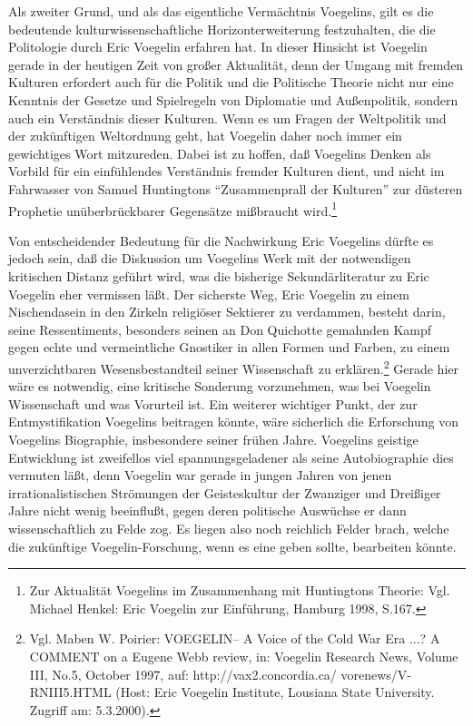 Als zweiter Grund, und als das eigentliche Vermächtnis Voegelins, gilt
es die bedeutende kulturwissenschaftliche Horizonterweiterung
festzuhalten, die die Politologie durch Eric Voegelin erfahren hat. In
dieser Hinsicht ist Voegelin gerade in der heutigen Zeit von großer
Aktualität, denn der Umgang mit fremden Kulturen erfordert auch für die
Politik und die Politische Theorie nicht nur eine Kenntnis der Gesetze
und Spielregeln von Diplomatie und Außenpolitik, sondern auch ein
Verständnis dieser Kulturen.  Wenn es um Fragen der Weltpolitik und der
zukünftigen Weltordnung geht, hat Voegelin daher noch immer ein
gewichtiges Wort mitzureden. Dabei ist zu hoffen, daß Voegelins Denken
als Vorbild für ein einfühlendes Verständnis fremder Kulturen dient, und
nicht im Fahrwasser von Samuel Huntingtons "`Zusammenprall der
Kulturen"' zur düsteren Prophetie unüberbrückbarer Gegensätze mißbraucht
wird.\footnote{Zur Aktualität Voegelins im Zusammenhang mit Huntingtons
  Theorie: Vgl.  Michael Henkel: Eric Voegelin zur Einführung, Hamburg
  1998, S.167.}

Von entscheidender Bedeutung für die Nachwirkung Eric Voegelins dürfte es
jedoch sein, daß die Diskussion um Voegelins Werk mit der notwendigen
kritischen Distanz geführt wird, was die bisherige Sekundärliteratur zu Eric
Voegelin eher vermissen läßt. Der sicherste Weg, Eric Voegelin zu einem
Nischendasein in den Zirkeln religiöser Sektierer zu verdammen, besteht
darin, seine Ressentiments, besonders seinen an Don Quichotte gemahnden Kampf
gegen echte und vermeintliche Gnostiker in allen Formen und Farben, zu einem
unverzichtbaren Wesensbestandteil seiner Wissenschaft zu
erklären.\footnote{Vgl.  Maben W. Poirier: VOEGELIN-- A Voice of the Cold War
  Era ...? A COMMENT on a Eugene Webb review, in: Voegelin Research News,
  Volume III, No.5, October 1997, auf: http://vax2.concordia.ca/\~{
    }vorenews/V-RNIII5.HTML (Host: Eric Voegelin Institute, Lousiana State
  University. Zugriff am: 5.3.2000).}  Gerade hier wäre es notwendig, eine
kritische Sonderung vorzunehmen, was bei Voegelin Wissenschaft und was
Vorurteil ist. Ein weiterer wichtiger Punkt, der zur Entmystifikation
Voegelins beitragen könnte, wäre sicherlich die Erforschung von Voegelins
Biographie, insbesondere seiner frühen Jahre. Voegelins geistige Entwicklung
ist zweifellos viel spannungsgeladener als seine Autobiographie dies vermuten
läßt, denn Voegelin war gerade in jungen Jahren von jenen irrationalistischen
Strömungen der Geisteskultur der Zwanziger und Dreißiger Jahre nicht wenig
beeinflußt, gegen deren politische Auswüchse er dann wissenschaftlich zu Felde
zog. Es liegen also noch reichlich Felder brach, welche die zukünftige
Voegelin-Forschung, wenn es eine geben sollte, bearbeiten könnte.


